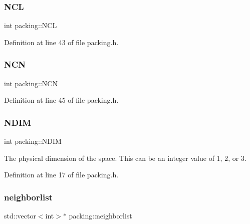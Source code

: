 \subsubsection{\texorpdfstring{N\+CL}{NCL}}
{\footnotesize\ttfamily int packing\+::\+N\+CL\hspace{0.3cm}{\ttfamily [protected]}}



Definition at line 43 of file packing.\+h.

\mbox{\label{classpacking_a4e173c52dc54a01ee8a8c42a0afd473f}} 
\subsubsection{\texorpdfstring{N\+CN}{NCN}}
{\footnotesize\ttfamily int packing\+::\+N\+CN\hspace{0.3cm}{\ttfamily [protected]}}



Definition at line 45 of file packing.\+h.

\mbox{\label{classpacking_a43d0d9d087ec30c847e89b5002e422d4}} 
\subsubsection{\texorpdfstring{N\+D\+IM}{NDIM}}
{\footnotesize\ttfamily int packing\+::\+N\+D\+IM\hspace{0.3cm}{\ttfamily [protected]}}



The physical dimension of the space. This can be an integer value of 1, 2, or 3. 



Definition at line 17 of file packing.\+h.

\mbox{\label{classpacking_a4ef3865ec63508098d2957022fe11b8f}} 
\subsubsection{\texorpdfstring{neighborlist}{neighborlist}}
{\footnotesize\ttfamily std\+::vector$<$int$>$$\ast$ packing\+::neighborlist\hspace{0.3cm}{\ttfamily [protected]}}



